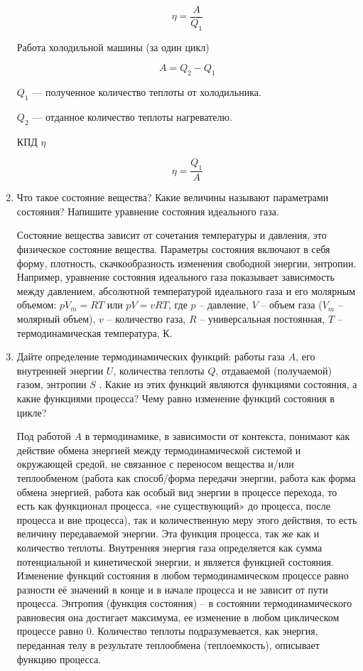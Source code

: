 \documentclass[12pt,a4paper]{article}%
\begin{document}
\begin{enumerate}
	\begin{equation}
	\eta = \dfrac{A}{Q_1}
	\end{equation}
	
	Работа холодильной машины (за один цикл)
	
	\begin{equation}
	A = Q_2 - Q_1
	\end{equation}
	
	$Q_1$ --- полученное количество теплоты от холодильника.
	
	$Q_2$ --- отданное количество теплоты нагревателю.
	
	КПД $\eta$
	
	\begin{equation}
	\eta = \dfrac{Q_1}{A}
	\end{equation}
	
	\item Что такое состояние вещества? Какие величины
	называют параметрами состояния? Напишите уравнение состояния идеального газа.
	
	Состояние вещества зависит от сочетания температуры и давления, это физическое состояние вещества. Параметры состояния включают в себя форму, плотность, скачкообразность изменения свободной энергии, энтропии. Например, уравнение состояния идеального газа показывает зависимость между давлением, абсолютной температурой идеального газа и его молярным объемом: $pV_m = RT$
	или $pV = vRT$, где $p$ – давление, $V$ – объем газа ($V_m$ – молярный объем), $v$ – количество газа, $R$ – универсальная постоянная, $T$ – термодинамическая температура, К. 
	
	\item Дайте определение термодинамических функций: работы газа $A$, его
	внутренней энергии $U$, количества теплоты $Q$, отдаваемой (получаемой) газом, энтропии $S$ . Какие из этих функций являются функциями состояния, а какие функциями процесса? Чему равно изменение функций состояния в цикле?
	
	Под работой $A$ в термодинамике, в зависимости от контекста, понимают как действие обмена энергией между термодинамической системой и окружающей средой, не связанное с переносом вещества и/или теплообменом (работа как способ/форма передачи энергии, работа как форма обмена энергией, работа как особый вид энергии в процессе перехода, то есть как функционал процесса, «не существующий» до процесса, после процесса и вне процесса), так и количественную меру этого действия, то есть величину передаваемой энергии. Эта функция процесса, так же как и количество теплоты. Внутренняя энергия газа определяется как сумма потенциальной и кинетической энергии, и является функцией состояния. Изменение функций состояния в любом термодинамическом процессе равно разности её значений в конце и в начале процесса и не зависит от пути процесса. Энтропия (функция состояния) – в состоянии термодинамического равновесия она достигает максимума, ее изменение в любом циклическом процессе равно $0$. Количество теплоты подразумевается, как энергия, переданная телу в результате теплообмена (теплоемкость), описывает функцию процесса. 
	

\end{enumerate}
\end{document}
